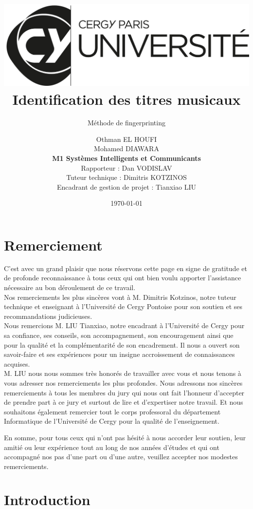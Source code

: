 \documentclass[11pt, report, french]{scrreprt}
\title{
	\includegraphics[scale=1]{img/logo.png}\\[4cm]
	\huge\textbf{Identification des titres musicaux}
}
\subtitle{Méthode de fingerprinting\\[2cm]}
\author{
	Othman EL HOUFI \\ Mohamed DIAWARA \\[2cm]
	\textbf{M1 Systèmes Intelligents et Communicants} \\[2cm]
	
	Rapporteur : Dan VODISLAV \\
	Tuteur technique : Dimitris KOTZINOS \\
	Encadrant de gestion de projet : Tianxiao LIU \\[2.5cm]
}
\date{\today}
\begin{document}
	
	\begin{titlepage}
		\maketitle
	\end{titlepage}

\chapter*{Remerciement}
C’est avec un grand plaisir que nous réservons cette page en signe de gratitude et de profonde reconnaissance à tous ceux qui ont bien voulu apporter l’assistance nécessaire au bon déroulement de ce travail.\\

Nos remerciements les plus sincères vont à M. Dimitris Kotzinos, notre tuteur technique et enseignant à l'Université de Cergy Pontoise pour son soutien et ses recommandations  judicieuses.\\

Nous remercions M. LIU Tianxiao, notre encadrant à l’Université de Cergy pour sa confiance, ses conseils, son accompagnement, son encouragement ainsi que pour la qualité et la complémentarité de son encadrement. Il nous a ouvert son savoir-faire et ses expériences pour un insigne accroissement de connaissances acquises. \\

M. LIU nous nous sommes très honorés de travailler avec vous et nous tenons à vous adresser nos remerciements les plus  profondes.  Nous adressons nos sincères remerciements à tous les membres du jury qui nous ont fait l’honneur d’accepter de prendre part à ce jury et surtout de lire et d’expertiser notre travail. Et nous souhaitons également remercier tout le corps professoral du département Informatique de l'Université de Cergy pour la qualité de l’enseignement. \\\par
En somme, pour tous ceux qui n’ont pas hésité à nous accorder leur soutien, leur amitié ou leur expérience tout au long de nos années d’études et qui ont accompagné nos pas d’une part ou d’une autre, veuillez accepter nos modestes remerciements.\\

\tableofcontents

\chapter{Introduction}
\end{document}
